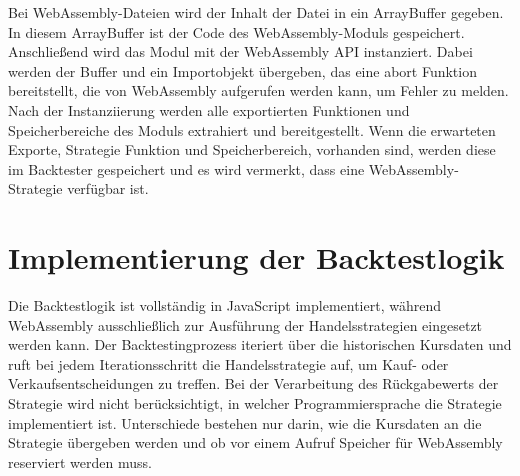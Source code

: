 Bei WebAssembly-Dateien wird der Inhalt der Datei in ein ArrayBuffer gegeben. In diesem ArrayBuffer ist der Code des WebAssembly-Moduls gespeichert.
Anschließend wird das Modul mit der WebAssembly API instanziert.
Dabei werden der Buffer und ein Importobjekt übergeben, das eine abort Funktion bereitstellt, die von WebAssembly aufgerufen werden kann, um Fehler zu melden.
Nach der Instanziierung werden alle exportierten Funktionen und Speicherbereiche des Moduls extrahiert und bereitgestellt.
Wenn die erwarteten Exporte, Strategie Funktion und Speicherbereich, vorhanden sind, werden diese im Backtester gespeichert und es wird vermerkt, dass eine WebAssembly-Strategie verfügbar ist.

\section{Implementierung der Backtestlogik}
\label{sec:ImplementierungenderBacktestlogik}

Die Backtestlogik ist vollständig in JavaScript implementiert, während WebAssembly ausschließlich zur Ausführung der Handelsstrategien eingesetzt werden kann.
Der Backtestingprozess iteriert über die historischen Kursdaten und ruft bei jedem Iterationsschritt die Handelsstrategie auf, um Kauf- oder Verkaufsentscheidungen zu treffen.
Bei der Verarbeitung des Rückgabewerts der Strategie wird nicht berücksichtigt, in welcher Programmiersprache die Strategie implementiert ist.
Unterschiede bestehen nur darin, wie die Kursdaten an die Strategie übergeben werden und ob vor einem Aufruf Speicher für WebAssembly reserviert werden muss.

